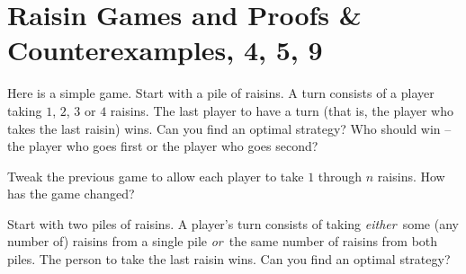 
%



\section{{Raisin Games} and {{Proofs \& Counterexamples, \framebox{\S} 4,  5,  9}}}

%
\thispagestyle{fancy}

\begin{enumerate}
  \Problem Here is a simple game.  Start with a pile of raisins.  A
  turn consists of a player taking $1$, $2$, $3$ or $4$ raisins.  The
  last player to have a turn (that is, the player who takes the last
  raisin) wins.  Can you find an optimal strategy?  Who should win --
  the player who goes first or the player who goes second?
  \vfill

  \Problem
  Tweak the previous game to allow each player to take $1$ through $n$
  raisins.  How has the game changed?
  \vfill

  \Problem\label{prob:2piles}%
  Start with two piles of raisins.  A player's turn consists of taking
  \emph{either}\ some (any number of) raisins from a single pile
  \emph{or}\ the same number of raisins from both piles.  The person
  to take the last raisin wins.  Can you find an optimal strategy?
  \vfill
  \newpage



%
%
%

\end{enumerate}


